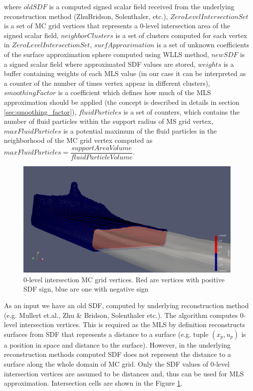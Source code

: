 where $oldSDF$ is a computed signed scalar field received from the underlying reconstruction method (ZhuBridson, Solenthaler, etc.), $ZeroLevelIntersectionSet$ is a set of MC grid vertices that represents a 0-level intersection area of the signed scalar field, $neighborClusters$ is a set of clusters computed for each vertex in $ZeroLevelIntersectionSet$, $surfApproximation$ is a set of unknown coefficients of the surface approximation sphere computed using WLLS method, $newSDF$ is a signed scalar field where approximated SDF values are stored, $weights$ is a buffer containing weights of each MLS value (in our case it can be interpreted as a counter of the number of times vertex appear in different clusters), $smoothingFactor$ is a coefficient which defines how much of the MLS approximation should be applied (the concept is described in details in section \ref{sec:smoothing_factor}), $fluidParticles$ is a set of counters, which contains the number of fluid particles within the support radius of MS grid vertex, $maxFluidParticles$ is a potential maximum of the fluid particles in the neighborhood of the MC grid vertex computed as $maxFluidParticles = \dfrac{supportAreaVolume}{fluidParticleVolume}$.\\
\begin{figure}[H]
	\begin{center}
		\includegraphics[width=\textwidth]{figures/MlsIntersectionVertexSet.png}
	\end{center}
	\caption{0-level intersection MC grid vertices. Red are vertices with positive SDF sign, blue are one with negative sign}
	\label{fig:intersection_vertices}
\end{figure}
As an input we have an old SDF, computed by underlying reconstruction method (e.g. Mullert et.al., Zhu \& Bridson, Solenthaler etc.). The algorithm computes 0-level intersection vertices. This is required as the MLS by definition reconstructs surfaces from SDF that represents a distance to a surface (e.g. tuple $(x_p, u_p)$ is a position in space and distance to the surface). However, in the underlying reconstruction methods computed SDF does not represent the distance to a surface along the whole domain of MC grid. Only the SDF values of 0-level intersection vertices are assumed to be distances and, thus can be used for MLS approximation. Intersection cells are shown in the Figure \ref{fig:intersection_vertices}.\\


